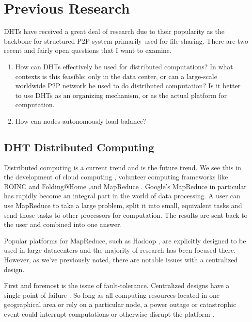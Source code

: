 \chapter{Previous Research}
\label{chapter:prev}


DHTs have received a great deal of research due to their popularity as the backbone for structured P2P system primarily used for file-sharing.
There are two recent and fairly open questions that I want to examine.

\begin{enumerate}
	\item How can DHTs effectively be used for distributed computations?  
	In what contexts is this feasible:  only in the data center, or can a large-scale worldwide P2P network be used to do distributed computation?
	Is it better to use DHTs as an organizing mechanism, or as the actual platform for computation.
	\item How can nodes autonomously load balance?
\end{enumerate}


\section{DHT Distributed Computing}
Distributed computing is a current trend and is the future trend.
We see this in the development of cloud computing \cite{p2p-cloud}, volunteer computing frameworks like BOINC \cite{anderson2004boinc} and Folding@Home \cite{larson2002folding},and MapReduce  \cite{mapreduce}.
Google's MapReduce  in particular has rapidly become an integral part in the world of data processing.  
A user can use MapReduce to take a large problem, split it into small, equivalent tasks and send those tasks to other processors for computation.  
The results are sent back to the user and combined into one answer. 

Popular platforms for MapReduce, such as Hadoop \cite{hadoop}  \cite{shvachko2010hadoop}, are explicitly designed to be used in large datacenters \cite{hadoopAssumptions} and the majority of research has been focused there.  
However, as we've previously noted, there are notable issues with a centralized design.

First and foremost is the issue of fault-tolerance.
Centralized designs have a single point of failure \cite{shvachko2010hadoop}.
So long as all computing resources located in one geographical area or rely on a particular node, a power outage or catastrophic event could interrupt computations or otherwise disrupt the platform \cite{babaoglu2014people}.

